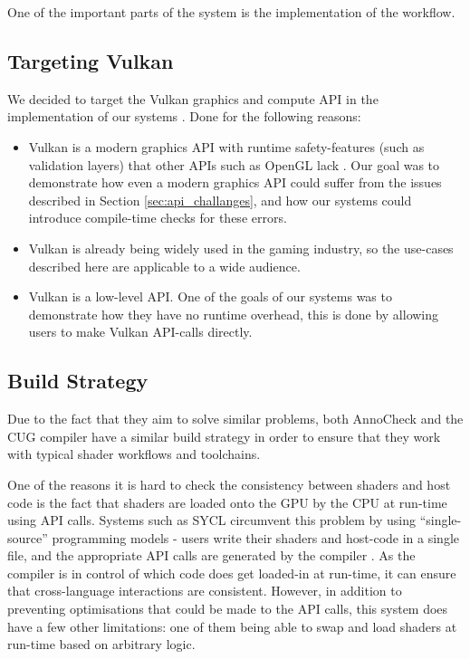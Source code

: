 \documentclass[a4paper,12pt,twoside,openright]{report}
\begin{document}
One of the important parts of the system is the implementation of the workflow.

\subsection{Targeting Vulkan}

We decided to target the Vulkan graphics and compute API in the implementation
of our systems \cite{Vulkan}. Done for the following reasons:

\begin{itemize}

    \item Vulkan is a modern graphics API with runtime safety-features (such as
    validation layers) that other APIs such as OpenGL lack \cite{TODO}. Our
    goal was to demonstrate how even a modern graphics API could suffer from
    the issues described in Section \ref{sec:api_challanges}, and how our
    systems could introduce compile-time checks for these errors.

    \item Vulkan is already being widely used in the gaming industry, so the
    use-cases described here are applicable to a wide audience.

    \item Vulkan is a low-level API. One of the goals of our systems was to
    demonstrate how they have no runtime overhead, this is done by allowing
    users to make Vulkan API-calls directly.

\end{itemize}

\subsection{Build Strategy}

Due to the fact that they aim to solve similar problems, both AnnoCheck and
the CUG compiler have a similar build strategy in order to ensure that they work
with typical shader workflows and toolchains.

One of the reasons it is hard to check the consistency between shaders and host
code is the fact that shaders are loaded onto the GPU by the CPU at run-time
using API calls. Systems such as SYCL circumvent this problem by using
``single-source'' programming models - users write their shaders and host-code
in a single file, and the appropriate API calls are generated by the compiler
\cite{TODO}. As the compiler is in control of which code does get loaded-in at
run-time, it can ensure that cross-language interactions are consistent.
However, in addition to preventing optimisations that could be made to the API
calls, this system does have a few other limitations: one of them being able to
swap and load shaders at run-time based on arbitrary logic.
\end{document}
